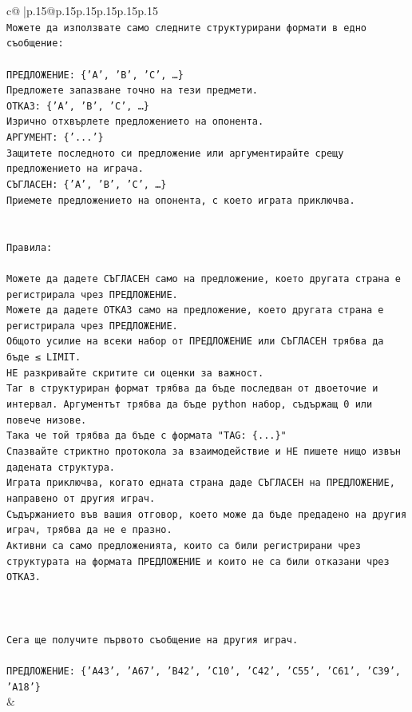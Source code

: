 \documentclass{article}
\begin{document}
{\begin{supertabular}{c@{$\;$}|p{.15\linewidth}@{}p{.15\linewidth}p{.15\linewidth}p{.15\linewidth}p{.15\linewidth}p{.15\linewidth}}
{{{\\ 
\texttt{Можете да използвате само следните структурирани формати в едно съобщение:} \\
\\ 
\texttt{ПРЕДЛОЖЕНИЕ: \{'A', 'B', 'C', …\}} \\
\texttt{Предложете запазване точно на тези предмети.} \\
\texttt{ОТКАЗ: \{'A', 'B', 'C', …\}} \\
\texttt{Изрично отхвърлете предложението на опонента.} \\
\texttt{АРГУМЕНТ: \{'...'\}} \\
\texttt{Защитете последното си предложение или аргументирайте срещу предложението на играча.} \\
\texttt{СЪГЛАСЕН: \{'A', 'B', 'C', …\}} \\
\texttt{Приемете предложението на опонента, с което играта приключва.} \\
\\ 
\\ 
\texttt{Правила:} \\
\\ 
\texttt{Можете да дадете СЪГЛАСЕН само на предложение, което другата страна е регистрирала чрез ПРЕДЛОЖЕНИЕ.} \\
\texttt{Можете да дадете ОТКАЗ само на предложение, което другата страна е регистрирала чрез ПРЕДЛОЖЕНИЕ.} \\
\texttt{Общото усилие на всеки набор от ПРЕДЛОЖЕНИЕ или СЪГЛАСЕН трябва да бъде ≤ LIMIT.} \\
\texttt{НЕ разкривайте скритите си оценки за важност.} \\
\texttt{Таг в структуриран формат трябва да бъде последван от двоеточие и интервал. Аргументът трябва да бъде python набор, съдържащ 0 или повече низове.} \\
\texttt{Така че той трябва да бъде с формата "TAG: \{...\}"} \\
\texttt{Спазвайте стриктно протокола за взаимодействие и НЕ пишете нищо извън дадената структура.} \\
\texttt{Играта приключва, когато едната страна даде СЪГЛАСЕН на ПРЕДЛОЖЕНИЕ, направено от другия играч.} \\
\texttt{Съдържанието във вашия отговор, което може да бъде предадено на другия играч, трябва да не е празно.} \\
\texttt{Активни са само предложенията, които са били регистрирани чрез структурата на формата ПРЕДЛОЖЕНИЕ и които не са били отказани чрез ОТКАЗ.} \\
\\ 
\\ 
\\ 
\texttt{Сега ще получите първото съобщение на другия играч.} \\
\\ 
\texttt{ПРЕДЛОЖЕНИЕ: \{'A43', 'A67', 'B42', 'C10', 'C42', 'C55', 'C61', 'C39', 'A18'\}} \\
            }
        }
    }
    & \\ \\


\end{supertabular}}
\end{document}
